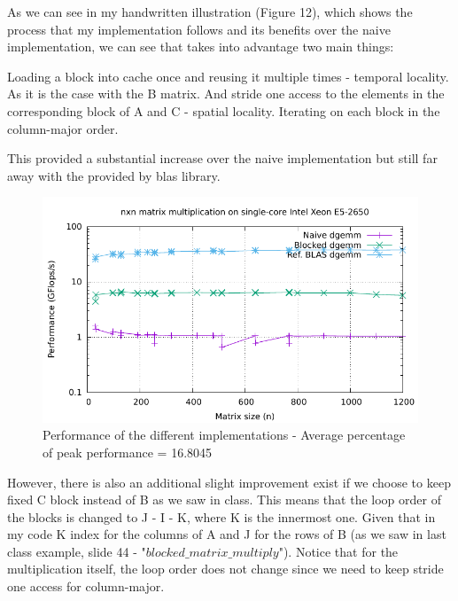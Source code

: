 \documentclass[unicode,11pt,a4paper,oneside,numbers=endperiod,openany]{scrartcl}
\begin{document}
As we can see in my handwritten illustration (Figure 12), which shows the process that my implementation follows and its benefits over the naive implementation, 
we can see that takes into advantage two main things: 

Loading a block into cache once and reusing it multiple times - temporal locality. As it is the case with the B matrix.
And stride one access to the elements in the corresponding block of A and C - spatial locality. Iterating on each block in the column-major order.

This provided a substantial increase over the naive implementation but still far away with the provided by blas library. 

\begin{figure}[H]
    \centering
    \includegraphics[width=\textwidth]{./exercise3/block/timing.pdf}
    \caption{Performance of the different implementations - Average percentage of peak performance = 16.8045} 
\end{figure}

However, there is also an additional slight improvement exist if we choose to keep fixed C block instead of B as we saw in class.
This means that the loop order of the blocks is changed to J -\> I -\> K, where K is the innermost one. Given that in my code
K index for the columns of A and J for the rows of B (as we saw in last class example, slide 44 - "$blocked\_ matrix\_multiply$"). 
Notice that for the multiplication itself, the loop order does not change since we need to keep stride one access for column-major.
\end{document}
